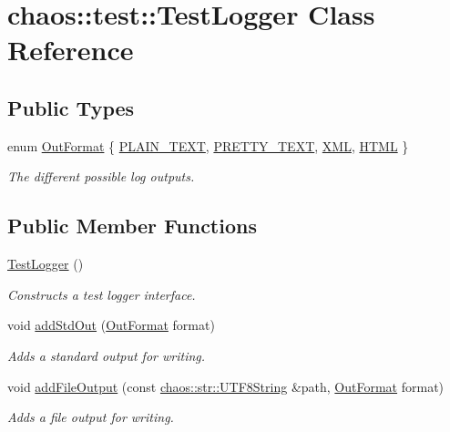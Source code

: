\hypertarget{classchaos_1_1test_1_1_test_logger}{\section{chaos\-:\-:test\-:\-:Test\-Logger Class Reference}
\label{classchaos_1_1test_1_1_test_logger}
}
\subsection*{Public Types}
\begin{DoxyCompactItemize}
\item 
enum \hyperlink{classchaos_1_1test_1_1_test_logger_a8e6f679501d623e41ac0f0c445a7820d}{Out\-Format} \{ \hyperlink{classchaos_1_1test_1_1_test_logger_a8e6f679501d623e41ac0f0c445a7820da11d08f338d72ed03a3f6615fe8dfbdef}{P\-L\-A\-I\-N\-\_\-\-T\-E\-X\-T}, 
\hyperlink{classchaos_1_1test_1_1_test_logger_a8e6f679501d623e41ac0f0c445a7820da7ef26881e91521776c39dba0009cea82}{P\-R\-E\-T\-T\-Y\-\_\-\-T\-E\-X\-T}, 
\hyperlink{classchaos_1_1test_1_1_test_logger_a8e6f679501d623e41ac0f0c445a7820da3ccea8ca2579aed0861e20023d7bff07}{X\-M\-L}, 
\hyperlink{classchaos_1_1test_1_1_test_logger_a8e6f679501d623e41ac0f0c445a7820dae7bbb57ad848e1cd78035e57bbcb11b2}{H\-T\-M\-L}
 \}
\begin{DoxyCompactList}\small\item\em The different possible log outputs. \end{DoxyCompactList}\end{DoxyCompactItemize}
\subsection*{Public Member Functions}
\begin{DoxyCompactItemize}
\item 
\hyperlink{classchaos_1_1test_1_1_test_logger_a59b5462eea92053f301b8c5e9c61892f}{Test\-Logger} ()
\begin{DoxyCompactList}\small\item\em Constructs a test logger interface. \end{DoxyCompactList}\item 
void \hyperlink{classchaos_1_1test_1_1_test_logger_a187403a01b59676a955817fa39bafbbb}{add\-Std\-Out} (\hyperlink{classchaos_1_1test_1_1_test_logger_a8e6f679501d623e41ac0f0c445a7820d}{Out\-Format} format)
\begin{DoxyCompactList}\small\item\em Adds a standard output for writing. \end{DoxyCompactList}\item 
void \hyperlink{classchaos_1_1test_1_1_test_logger_a0525b93567d29d8cf1f0de1b5b32be09}{add\-File\-Output} (const \hyperlink{classchaos_1_1str_1_1_u_t_f8_string}{chaos\-::str\-::\-U\-T\-F8\-String} \&path, \hyperlink{classchaos_1_1test_1_1_test_logger_a8e6f679501d623e41ac0f0c445a7820d}{Out\-Format} format)
\begin{DoxyCompactList}\small\item\em Adds a file output for writing. \end{DoxyCompactList}\end{DoxyCompactItemize}


